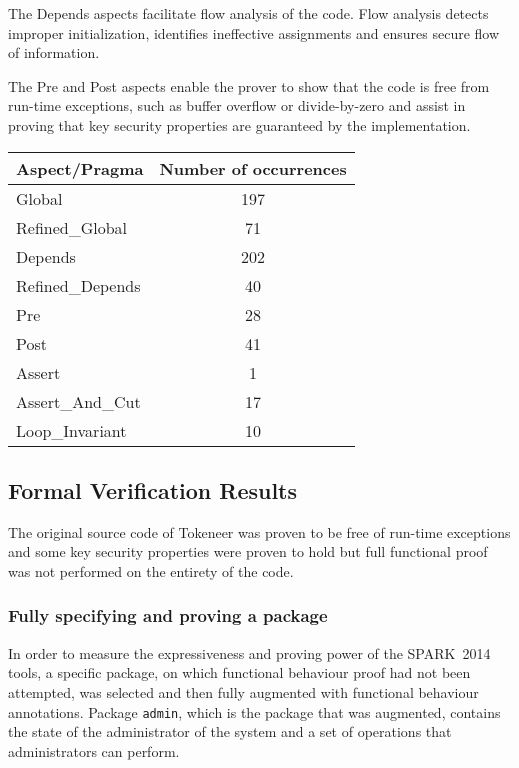 \documentclass[10pt,a4paper,twocolumn]{article}
\newcommand{\newspark}{SPARK~2014\xspace}
\newcommand{\SPARK}[1]{\lstinline[language=Ada,basicstyle={\footnotesize
      \sffamily},framesep=0pt]$#1$}
\begin{document}
The Depends aspects facilitate flow analysis of the code. Flow
analysis detects improper initialization, identifies ineffective
assignments and ensures secure flow of information.

The Pre and Post aspects enable the prover to show that the code is
free from run-time exceptions, such as buffer overflow or
divide-by-zero and assist in proving that key security properties are
guaranteed by the implementation.

\begin{tabular}{|l|c|}
\hline
Aspect/Pragma       & Number of occurrences  \\
\hline
\hline
Global              & 197 \\
\hline
Refined\_Global     & 71 \\
\hline
Depends             & 202 \\
\hline
Refined\_Depends    & 40 \\
\hline
Pre                 & 28 \\
\hline
Post                & 41 \\
\hline
Assert              & 1 \\
\hline
Assert\_And\_Cut    & 17 \\
\hline
Loop\_Invariant     & 10 \\
\hline
\end{tabular}

\subsection{Formal Verification Results}

The original source code of Tokeneer was proven to be free of run-time
exceptions and some key security properties were proven to hold but
full functional proof was not performed on the entirety of the code.

\subsubsection{Fully specifying and proving a package}

In order to measure the expressiveness and proving power of the
\newspark tools, a specific package, on which functional behaviour
proof had not been attempted, was selected and then fully augmented
with functional behaviour annotations. Package \SPARK{admin}, which is
the package that was augmented, contains the state of the
administrator of the system and a set of operations that
administrators can perform.
\end{document}
